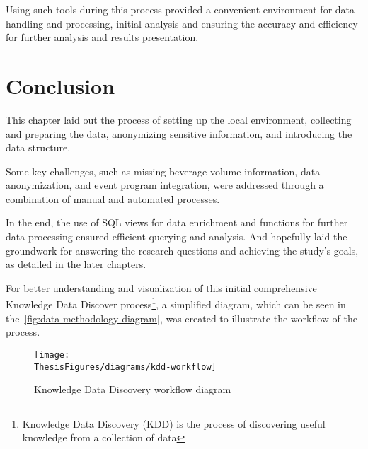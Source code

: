 Using such tools during this process provided a convenient environment for data handling and processing, initial analysis and ensuring the accuracy and efficiency for further analysis and results presentation.


\section{Conclusion}
\label{sec:data-methodology-conclusion}
This chapter laid out the process of setting up the local environment, collecting and preparing the data, anonymizing sensitive information, and introducing the data structure.

Some key challenges, such as missing beverage volume information, data anonymization, and event program integration, were addressed through a combination of manual and automated processes.

In the end, the use of SQL views for data enrichment and functions for further data processing ensured efficient querying and analysis.
And hopefully laid the groundwork for answering the research questions and achieving the study's goals, as detailed in the later chapters.

For better understanding and visualization of this initial comprehensive Knowledge Data Discover process\footnote{Knowledge Data Discovery (KDD) is the process of discovering useful knowledge from a collection of data\cite{uord_kdd_1_kdd}}, a simplified diagram, which can be seen in the~\autoref{fig:data-methodology-diagram}, was created to illustrate the workflow of the process.

\begin{figure}[h]
	\centering
	\texttt{[image: \\ThesisFigures/diagrams/kdd-workflow]}
	\caption{Knowledge Data Discovery workflow diagram}
	\label{fig:data-methodology-diagram}
\end{figure}
